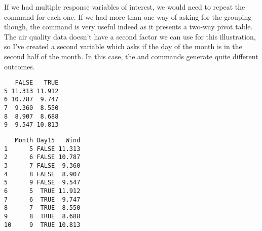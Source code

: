 If we had multiple response variables of interest, we would need to repeat the command for each one. If we had more than one way of asking for the grouping though, the  command is very useful indeed as it presents a two-way pivot table. The air quality data doesn't have a second factor we can use for this illustration, so I've created a second variable which asks if the day of the month is in the second half of the month. In this case, the  and  commands generate quite different outcomes.
\begin{knitrout}
\color{fgcolor}\begin{kframe}
\begin{alltt}
\hlstd{> } \hlkwb{=}  \hlopt{>} 
\hlstd{> } 
\end{alltt}
\begin{verbatim}
   FALSE   TRUE
5 11.313 11.912
6 10.787  9.747
7  9.360  8.550
8  8.907  8.688
9  9.547 10.813
\end{verbatim}
\begin{alltt}
\hlstd{> } \hlopt{~}  \hlopt{+}  
\end{alltt}
\begin{verbatim}
   Month Day15   Wind
1      5 FALSE 11.313
2      6 FALSE 10.787
3      7 FALSE  9.360
4      8 FALSE  8.907
5      9 FALSE  9.547
6      5  TRUE 11.912
7      6  TRUE  9.747
8      7  TRUE  8.550
9      8  TRUE  8.688
10     9  TRUE 10.813
\end{verbatim}
\end{kframe}
\end{knitrout}
 
